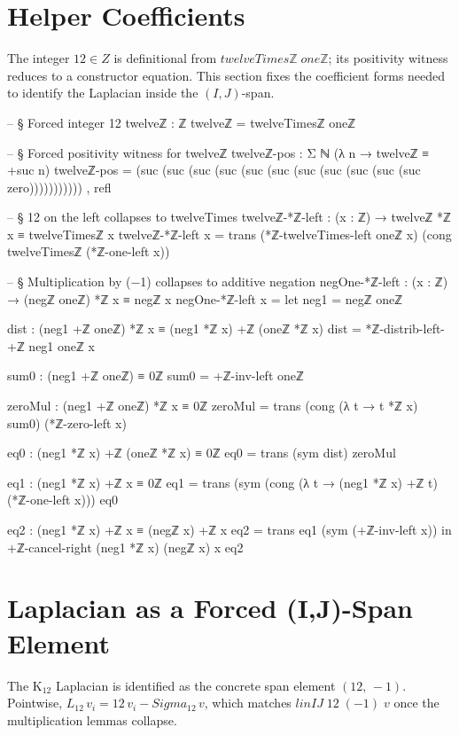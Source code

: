 \documentclass[11pt,a4paper]{book}
\def\Sigma{Sigma}%
\def\mathbb#1{#1}%
\def\texttt#1{#1}%
\def\texorpdfstring#1#2{#2}%
\begin{document}
\section{Helper Coefficients}

The integer $12 \in \mathbb{Z}$ is definitional from
$\texttt{twelveTimesℤ}\;\texttt{oneℤ}$; its positivity witness
reduces to a constructor equation.  This section fixes the coefficient forms
needed to identify the Laplacian inside the $(I,J)$-span.

\begin{code}
-- § Forced integer 12
twelveℤ : ℤ
twelveℤ = twelveTimesℤ oneℤ

-- § Forced positivity witness for twelveℤ
twelveℤ-pos : Σ ℕ (λ n → twelveℤ ≡ +suc n)
twelveℤ-pos = (suc (suc (suc (suc (suc (suc (suc (suc (suc (suc (suc zero))))))))))) , refl

-- § 12 on the left collapses to twelveTimes
twelveℤ-*ℤ-left : (x : ℤ) → twelveℤ *ℤ x ≡ twelveTimesℤ x
twelveℤ-*ℤ-left x =
  trans
    (*ℤ-twelveTimes-left oneℤ x)
    (cong twelveTimesℤ (*ℤ-one-left x))

-- § Multiplication by (−1) collapses to additive negation
negOne-*ℤ-left : (x : ℤ) → (negℤ oneℤ) *ℤ x ≡ negℤ x
negOne-*ℤ-left x =
  let
    neg1 = negℤ oneℤ

    dist : (neg1 +ℤ oneℤ) *ℤ x ≡ (neg1 *ℤ x) +ℤ (oneℤ *ℤ x)
    dist = *ℤ-distrib-left-+ℤ neg1 oneℤ x

    sum0 : (neg1 +ℤ oneℤ) ≡ 0ℤ
    sum0 = +ℤ-inv-left oneℤ

    zeroMul : (neg1 +ℤ oneℤ) *ℤ x ≡ 0ℤ
    zeroMul = trans (cong (λ t → t *ℤ x) sum0) (*ℤ-zero-left x)

    eq0 : (neg1 *ℤ x) +ℤ (oneℤ *ℤ x) ≡ 0ℤ
    eq0 = trans (sym dist) zeroMul

    eq1 : (neg1 *ℤ x) +ℤ x ≡ 0ℤ
    eq1 = trans (sym (cong (λ t → (neg1 *ℤ x) +ℤ t) (*ℤ-one-left x))) eq0

    eq2 : (neg1 *ℤ x) +ℤ x ≡ (negℤ x) +ℤ x
    eq2 = trans eq1 (sym (+ℤ-inv-left x))
  in
  +ℤ-cancel-right (neg1 *ℤ x) (negℤ x) x eq2
\end{code}


\section{Laplacian as a Forced \texorpdfstring{$(I,J)$}{(I,J)}-Span Element}

The K$_{12}$ Laplacian is identified as the concrete span element
$(12,\,-1)$.
Pointwise, $L_{12}\,v_i = 12\,v_i - \Sigma_{12}\,v$, which
matches $\texttt{linIJ}\;12\;(-1)\;v$ once the multiplication
lemmas collapse.
\end{document}
